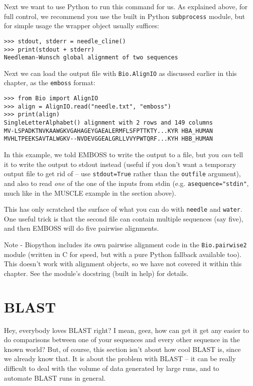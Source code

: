 \documentclass{report}
\begin{document}
Next we want to use Python to run this command for us. As explained above,
for full control, we recommend you use the built in Python \texttt{subprocess}
module, but for simple usage the wrapper object usually suffices:

\begin{verbatim}
>>> stdout, stderr = needle_cline()
>>> print(stdout + stderr)
Needleman-Wunsch global alignment of two sequences
\end{verbatim}

Next we can load the output file with \verb|Bio.AlignIO| as
discussed earlier in this chapter, as the \texttt{emboss} format:

\begin{verbatim}
>>> from Bio import AlignIO
>>> align = AlignIO.read("needle.txt", "emboss")
>>> print(align)
SingleLetterAlphabet() alignment with 2 rows and 149 columns
MV-LSPADKTNVKAAWGKVGAHAGEYGAEALERMFLSFPTTKTY...KYR HBA_HUMAN
MVHLTPEEKSAVTALWGKV--NVDEVGGEALGRLLVVYPWTQRF...KYH HBB_HUMAN
\end{verbatim}

In this example, we told EMBOSS to write the output to a file, but you
\emph{can} tell it to write the output to stdout instead (useful if you
don't want a temporary output file to get rid of -- use
\texttt{stdout=True} rather than the \texttt{outfile} argument), and
also to read \emph{one} of the one of the inputs from stdin (e.g.
\texttt{asequence="stdin"}, much like in the MUSCLE example in the
section above).

This has only scratched the surface of what you can do with \texttt{needle}
and \texttt{water}. One useful trick is that the second file can contain
multiple sequences (say five), and then EMBOSS will do five pairwise
alignments.

Note - Biopython includes its own pairwise alignment code in the \verb|Bio.pairwise2|
module (written in C for speed, but with a pure Python fallback available too). This
doesn't work with alignment objects, so we have not covered it within this chapter.
See the module's docstring (built in help) for details.

\chapter{BLAST}
\label{chapter:blast}
Hey, everybody loves BLAST right? I mean, geez, how can get it get any easier to do comparisons between one of your sequences and every other sequence in the known world? But, of course, this section isn't about how cool BLAST is, since we already know that. It is about the problem with BLAST -- it can be really difficult to deal with the volume of data generated by large runs, and to automate BLAST runs in general.
\end{document}

